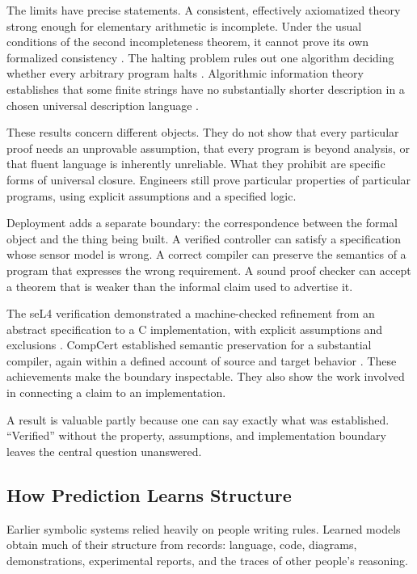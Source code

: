 \documentclass[11pt,openany]{book}
\begin{document}
The limits have precise statements. A consistent, effectively axiomatized theory strong enough for elementary arithmetic is incomplete. Under the usual conditions of the second incompleteness theorem, it cannot prove its own formalized consistency \cite{godel1931}. The halting problem rules out one algorithm deciding whether every arbitrary program halts \cite{turing1936}. Algorithmic information theory establishes that some finite strings have no substantially shorter description in a chosen universal description language \cite{chaitin1987}.

These results concern different objects. They do not show that every particular proof needs an unprovable assumption, that every program is beyond analysis, or that fluent language is inherently unreliable. What they prohibit are specific forms of universal closure. Engineers still prove particular properties of particular programs, using explicit assumptions and a specified logic.

Deployment adds a separate boundary: the correspondence between the formal object and the thing being built. A verified controller can satisfy a specification whose sensor model is wrong. A correct compiler can preserve the semantics of a program that expresses the wrong requirement. A sound proof checker can accept a theorem that is weaker than the informal claim used to advertise it.

The seL4 verification demonstrated a machine-checked refinement from an abstract specification to a C implementation, with explicit assumptions and exclusions \cite{klein2009sel4}. CompCert established semantic preservation for a substantial compiler, again within a defined account of source and target behavior \cite{leroy2009compcert}. These achievements make the boundary inspectable. They also show the work involved in connecting a claim to an implementation.

A result is valuable partly because one can say exactly what was established. “Verified” without the property, assumptions, and implementation boundary leaves the central question unanswered.

\subsection{How Prediction Learns Structure}

Earlier symbolic systems relied heavily on people writing rules. Learned models obtain much of their structure from records: language, code, diagrams, demonstrations, experimental reports, and the traces of other people's reasoning.
\end{document}
